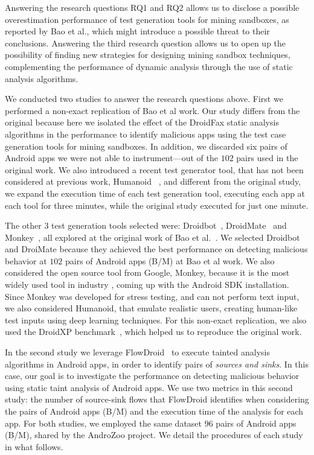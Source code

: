 Answering the research questions RQ1 and RQ2 allows us to disclose a possible overestimation performance of test generation tools for mining sandboxes,
as reported by Bao et al., which might introduce a possible threat to their conclusions. Answering the third research question
allows us to open up the possibility of finding new strategies for designing mining sandbox techniques, complementing the performance of
dynamic analysis through the use of static analysis algorithms.

We conducted two studies to answer the research questions above. First we performed a non-exact replication of Bao et al work. Our study differs from the original because here we isolated the effect of the DroidFax static analysis algorithms in the performance to identify malicious apps using the test case generation tools for
mining sandboxes. In addition, we discarded six pairs of
Android apps we were not able to instrument---out of the $102$ pairs used in the original work. We also introduced a recent test generator tool, that has not been considered at previous work, Humanoid ~\cite{DBLP:conf/kbse/LiY0C19}, and different from the original study, we expand the execution time of each test generation tool, executing each app at each tool for three minutes, while the original study executed for just one minute.

The other $3$ test generation tools selected were: Droidbot~\cite{DBLP:conf/icse/LiYGC17},
DroidMate~\cite{DBLP:conf/icse/JamrozikZ16} and Monkey~\cite{Monkey}, all explored at the original work of Bao et al.~\cite{DBLP:conf/icse/JamrozikZ16}. We selected Droidbot and DroiMate because they achieved
the best performance on detecting malicious behavior at $102$ pairs of Android apps (B/M) at Bao et al work. We also considered the open source tool from Google, Monkey, because it is the most widely used tool in industry \cite{DBLP:conf/sigsoft/ZengLZXDLYX16}, coming up with the Android SDK installation. Since Monkey was developed for stress testing, and can not perform text input, we also considered Humanoid, that emulate realistic users, creating human-like test inputs using deep learning techniques.
For this non-exact replication, we also used the DroidXP benchmark~\cite{DBLP:conf/scam/CostaMCMVBC20},
which helped us to reproduce the original work.

In the second study we leverage FlowDroid~\cite{DBLP:conf/pldi/ArztRFBBKTOM14} to execute
tainted analysis algorithms in Android apps, in order to identify pairs of \emph{sources and sinks}. In this case,
our goal is to investigate the performance on detecting malicious
behavior using static taint analysis of Android apps. We use two metrics in this second study: the number
of source-sink flows that FlowDroid identifies when considering the pairs of Android apps (B/M) and the
execution time of the analysis for each app.
For both studies, we employed the same dataset $96$ pairs of Android apps (B/M),
shared by the AndroZoo \cite{DBLP:conf/msr/AllixBKT16} project. We detail the procedures of each study in what follows.

